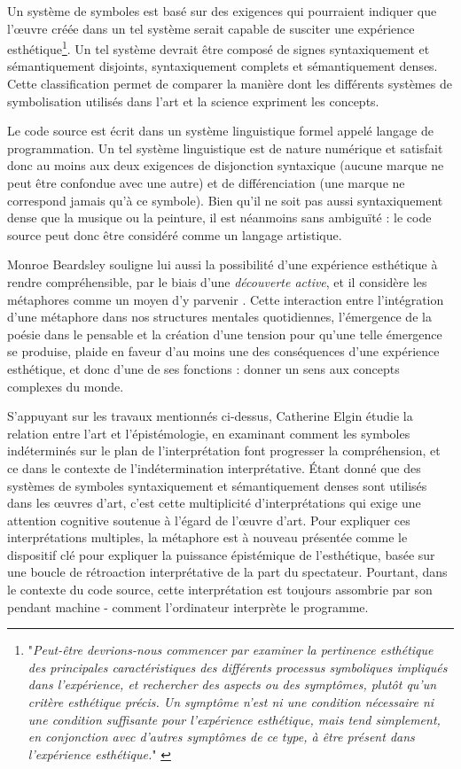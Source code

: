 \documentclass{article}
\begin{document}
Un système de symboles est basé sur des exigences qui pourraient indiquer que l'œuvre créée dans un tel système serait capable de susciter une expérience esthétique\footnote{"\emph{Peut-être devrions-nous commencer par examiner la pertinence esthétique des principales caractéristiques des différents processus symboliques impliqués dans l'expérience, et rechercher des aspects ou des symptômes, plutôt qu'un critère esthétique précis. Un symptôme n'est ni une condition nécessaire ni une condition suffisante pour l'expérience esthétique, mais tend simplement, en conjonction avec d'autres symptômes de ce type, à être présent dans l'expérience esthétique.}" \citep{goodman_languages_1976}}. Un tel système devrait être composé de signes syntaxiquement et sémantiquement disjoints, syntaxiquement complets et sémantiquement denses. Cette classification permet de comparer la manière dont les différents systèmes de symbolisation utilisés dans l'art et la science expriment les concepts.

Le code source est écrit dans un système linguistique formel appelé langage de programmation. Un tel système linguistique est de nature numérique et satisfait donc au moins aux deux exigences de disjonction syntaxique (aucune marque ne peut être confondue avec une autre) et de différenciation (une marque ne correspond jamais qu'à ce symbole). Bien qu'il ne soit pas aussi syntaxiquement dense que la musique ou la peinture, il est néanmoins sans ambiguïté : le code source peut donc être considéré comme un langage artistique.

Monroe Beardsley souligne lui aussi la possibilité d'une expérience esthétique à rendre compréhensible, par le biais d'une \emph{découverte active}, et il considère les métaphores comme un moyen d'y parvenir \citep{beardsley_aesthetic_1970}. Cette interaction entre l'intégration d'une métaphore dans nos structures mentales quotidiennes, l'émergence de la poésie dans le pensable et la création d'une tension pour qu'une telle émergence se produise, plaide en faveur d'au moins une des conséquences d'une expérience esthétique, et donc d'une de ses fonctions : donner un sens aux concepts complexes du monde.

S'appuyant sur les travaux mentionnés ci-dessus, Catherine Elgin étudie la relation entre l'art et l'épistémologie, en examinant comment les symboles indéterminés sur le plan de l'interprétation font progresser la compréhension, et ce dans le contexte de l'indétermination interprétative. Étant donné que des systèmes de symboles syntaxiquement et sémantiquement denses sont utilisés dans les œuvres d'art, c'est cette multiplicité d'interprétations qui exige une attention cognitive soutenue à l'égard de l'œuvre d'art. Pour expliquer ces interprétations multiples, la métaphore est à nouveau présentée comme le dispositif clé pour expliquer la puissance épistémique de l'esthétique, basée sur une boucle de rétroaction interprétative de la part du spectateur. Pourtant, dans le contexte du code source, cette interprétation est toujours assombrie par son pendant machine - comment l'ordinateur interprète le programme.
\end{document}
